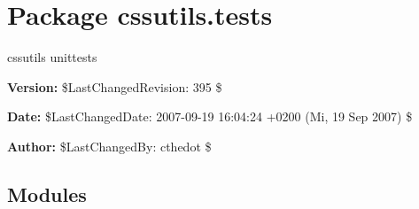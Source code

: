 %
%
%


\section{Package cssutils.tests}

    \label{cssutils:tests}
cssutils unittests

\textbf{Version:} \$LastChangedRevision: 395 \$



\textbf{Date:} \$LastChangedDate: 2007-09-19 16:04:24 +0200 (Mi, 19 Sep 2007) \$



\textbf{Author:} \$LastChangedBy: cthedot \$





\subsection{Modules}

